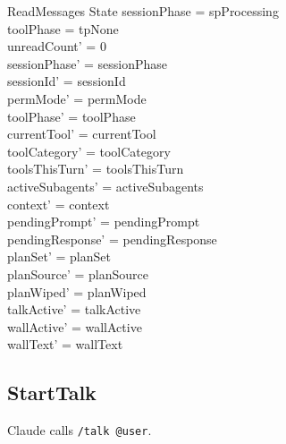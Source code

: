 \documentclass[a4paper,10pt,fleqn]{article}
\begin{document}
\begin{schema}{ReadMessages}
  \Delta State
  \where
  sessionPhase = spProcessing \\
  toolPhase = tpNone \\
  unreadCount' = 0 \\
  sessionPhase' = sessionPhase \\
  sessionId' = sessionId \\
  permMode' = permMode \\
  toolPhase' = toolPhase \\
  currentTool' = currentTool \\
  toolCategory' = toolCategory \\
  toolsThisTurn' = toolsThisTurn \\
  activeSubagents' = activeSubagents \\
  context' = context \\
  pendingPrompt' = pendingPrompt \\
  pendingResponse' = pendingResponse \\
  planSet' = planSet \\
  planSource' = planSource \\
  planWiped' = planWiped \\
  talkActive' = talkActive \\
  wallActive' = wallActive \\
  wallText' = wallText
\end{schema}

\subsection{StartTalk}

Claude calls \texttt{/talk @user}.
\end{document}
